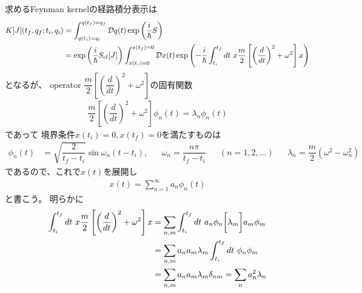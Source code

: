 求めるFeynman kernelの経路積分表示は
\begin{align}
    K[J]( t_f, q_f ; t_i, q_i )
    &=
    \int_{q(t_i) = q_i}^{q(t_f) = q_f}
        \mathcal{D} q(t)
    \exp\left(
        \dfrac{i}{\hbar} S
    \right)
\notag\\&=
    \exp\left(
        \dfrac{i}{\hbar} S_{cl} [J]
    \right)
    \int_{x(t_i) = 0}^{x(t_f) = 0}
        \mathcal{D} x(t)
    \exp\left(
        -
        \dfrac{ i }{\hbar}
        \int_{t_i}^{t_f} dt\ 
        x
        \dfrac{ m }{2}
        \left[
            \left(
                \dfrac{d}{dt}
            \right)^2
            +
            \omega^2
        \right]
        x
    \right)
\label{harmonic oscillator action operator matrix}
\end{align}
となるが、
operator $
    \dfrac{ m }{2}
    \left[
    \left(
        \dfrac{d}{dt}
    \right)^2
+
    \omega^2
    \right]
$の固有関数
\begin{align}
    \dfrac{ m }{2}
    \left[
        \left(
            \dfrac{d}{dt}
        \right)^2
        +
        \omega^2
    \right]
    \phi_n(t)
    =
    \lambda_n
    \phi_n(t)
\end{align}
であって
境界条件$x(t_i) = 0, x(t_f) = 0$を満たすものは
\begin{align}
    \phi_n(t)
    &=
    \sqrt{ 
        \dfrac{
            2
        }{
            t_f - t_i
        }
    }
    \sin \omega_n (t - t_i)
    ,
    &&
    \omega_n
    =
    \dfrac{n \pi}{t_f - t_i}
    &&
    (n = 1, 2, \dots)
    &&
    \lambda_n
    =
    \dfrac{ m }{2}
    (
        \omega^2
    -
        \omega_n^2
    )
\end{align}
であるので、これで$x(t)$を展開し
\begin{align}
    x(t)
= \sum_{n=1}^\infty
    a_n
    \phi_n(t)
\end{align}
と書こう。
明らかに
\begin{align}
    \int_{t_i}^{t_f} dt\ 
    x
    \dfrac{ m }{2}
    \left[
        \left(
            \dfrac{d}{dt}
        \right)^2
        +
        \omega^2
    \right]
    x
    &=
    \sum_{n,m}
    \int_{t_i}^{t_f} dt\ 
    a_n \phi_n
    \bigg[
        \lambda_m
    \bigg]
    a_m \phi_m
\notag\\&=
    \sum_{n,m}
        a_n a_m
        \lambda_m
    \int_{t_i}^{t_f} dt\ 
    \phi_n
    \phi_m
\notag\\&=
    \sum_{n,m}
        a_n a_m
        \lambda_m
    \delta_{nm}
    =
    \sum_{n}
    a_n^2
    \lambda_n
\end{align}
